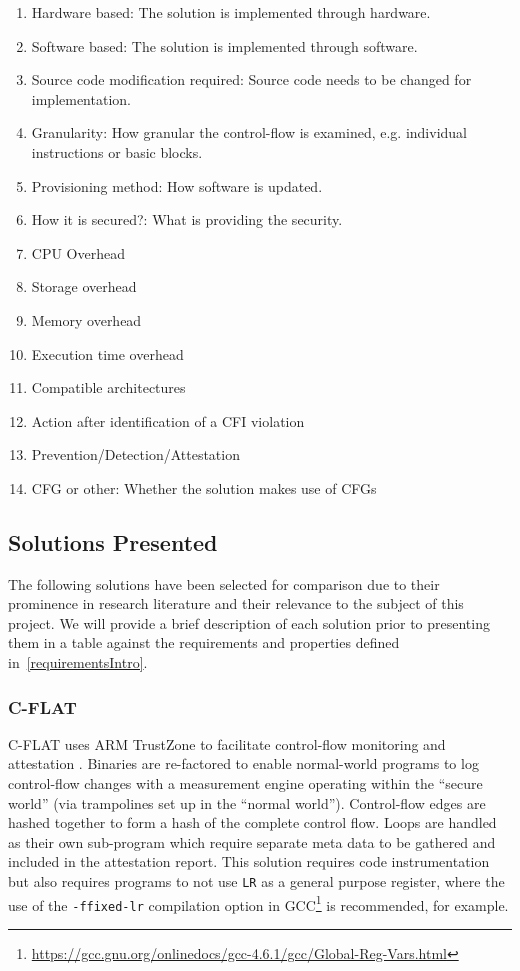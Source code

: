\begin{enumerate}[label=(\arabic*),noitemsep]
	\item Hardware based: The solution is implemented through hardware.
	\item Software based: The solution is implemented through software.
	\item Source code modification required: Source code needs to be changed for implementation.
	\item Granularity: How granular the control-flow is examined, e.g. individual instructions or basic blocks.
	\item Provisioning method: How software is updated.
	\item How it is secured?: What is providing the security.
	\item CPU Overhead
	\item Storage overhead
	\item Memory overhead
	\item Execution time overhead
	\item Compatible architectures
	\item Action after identification of a CFI violation
	\item Prevention\slash Detection\slash Attestation
	\item CFG or other: Whether the solution makes use of CFGs
\end{enumerate}

\subsection{Solutions Presented}

The following solutions have been selected for comparison due to their prominence in research literature and their relevance to the subject of this project. We will provide a brief description of each solution prior to presenting them in a table against the requirements and properties defined in~\ref{requirementsIntro}.

\subsubsection*{C-FLAT}
C-FLAT uses ARM TrustZone to facilitate control-flow monitoring and attestation \cite{Abera2016}. Binaries are re-factored to enable normal-world programs to log control-flow changes with a measurement engine operating within the ``secure world'' (via trampolines set up in the ``normal world''). Control-flow edges are hashed together to form a hash of the complete control flow. Loops are handled as their own sub-program which require separate meta data to be gathered and included in the attestation report. This solution requires code instrumentation but also requires programs to not use \verb|LR| as a general purpose register, where the use of the \verb|-ffixed-lr| compilation option in GCC\footnote{\url{https://gcc.gnu.org/onlinedocs/gcc-4.6.1/gcc/Global-Reg-Vars.html}} is recommended, for example.


